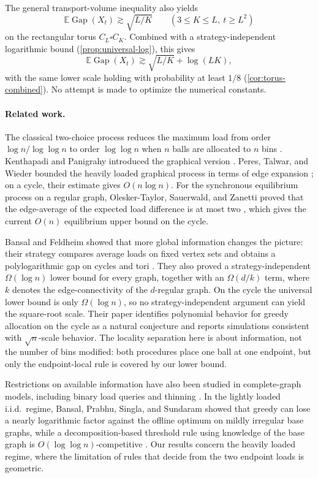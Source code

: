 \documentclass[11pt]{article}
\theoremstyle{remark}
\newcommand{\E}{\mathbb{E}}
\newcommand{\Gap}{\operatorname{Gap}}
\begin{document}
The general transport-volume inequality also yields
\[
 \E\Gap(X_t)\gtrsim \sqrt{L/K}
 \qquad (3\le K\le L,\ t\ge L^2)
\]
on the rectangular torus $C_L\square C_K$. Combined with a strategy-independent logarithmic bound (\cref{prop:universal-log}), this gives
\[
 \E\Gap(X_t)\gtrsim \sqrt{L/K}+\log(LK),
\]
with the same lower scale holding with probability at least $1/8$ (\cref{cor:torus-combined}). No attempt is made to optimize the numerical constants.

\paragraph{Related work.}
The classical two-choice process reduces the maximum load from order $\log n/\log\log n$ to order $\log\log n$ when $n$ balls are allocated to $n$ bins \cite{AzarBroderKarlinUpfal1999}. Kenthapadi and Panigrahy introduced the graphical version \cite{KenthapadiPanigrahy2006}. Peres, Talwar, and Wieder bounded the heavily loaded graphical process in terms of edge expansion \cite{PeresTalwarWieder2015}; on a cycle, their estimate gives $O(n\log n)$. For the synchronous equilibrium process on a regular graph, Olesker-Taylor, Sauerwald, and Zanetti proved that the edge-average of the expected load difference is at most two \cite{OleskerTaylorSauerwaldZanetti2026}, which gives the current $O(n)$ equilibrium upper bound on the cycle.

Bansal and Feldheim showed that more global information changes the picture: their strategy compares average loads on fixed vertex sets and obtains a polylogarithmic gap on cycles and tori \cite{BansalFeldheim}. They also proved a strategy-independent $\Omega(\log n)$ lower bound for every graph, together with an $\Omega(d/k)$ term, where $k$ denotes the edge-connectivity of the $d$-regular graph. On the cycle the universal lower bound is only $\Omega(\log n)$, so no strategy-independent argument can yield the square-root scale. Their paper identifies polynomial behavior for greedy allocation on the cycle as a natural conjecture and reports simulations consistent with $\sqrt n$-scale behavior. The locality separation here is about information, not the number of bins modified: both procedures place one ball at one endpoint, but only the endpoint-local rule is covered by our lower bound.

Restrictions on available information have also been studied in complete-graph models, including binary load queries \cite{LosSauerwald2022} and thinning \cite{FeldheimGurelGurevich2021}. In the lightly loaded i.i.d.\ regime, Bansal, Prabhu, Singla, and Sundaram showed that greedy can lose a nearly logarithmic factor against the offline optimum on mildly irregular base graphs, while a decomposition-based threshold rule using knowledge of the base graph is $O(\log\log n)$-competitive \cite{BansalPrabhuSinglaSundaram2026}. Our results concern the heavily loaded regime, where the limitation of rules that decide from the two endpoint loads is geometric.
\end{document}
